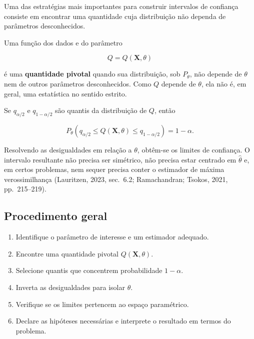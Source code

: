 \documentclass[
  letterpaper,
  DIV=11,
  numbers=noendperiod]{scrreprt}
\providecommand{\tightlist}{%
  \setlength{\itemsep}{0pt}\setlength{\parskip}{0pt}}\usepackage{longtable,booktabs,array}
\begin{document}
Uma das estratégias mais importantes para construir intervalos de
confiança consiste em encontrar uma quantidade cuja distribuição não
dependa de parâmetros desconhecidos.

\begin{tcolorbox}[enhanced jigsaw, colback=white, leftrule=.75mm, colbacktitle=quarto-callout-note-color!10!white, breakable, titlerule=0mm, bottomtitle=1mm, title=\textcolor{quarto-callout-note-color}{\faInfo}\hspace{0.5em}{Definição --- quantidade pivotal}, colframe=quarto-callout-note-color-frame, toprule=.15mm, opacityback=0, bottomrule=.15mm, opacitybacktitle=0.6, arc=.35mm, toptitle=1mm, rightrule=.15mm, coltitle=black, left=2mm]

Uma função dos dados e do parâmetro

\[Q=Q(\mathbf{X},\theta)\]

é uma \textbf{quantidade pivotal} quando sua distribuição, sob
\(P_\theta\), não depende de \(\theta\) nem de outros parâmetros
desconhecidos. Como \(Q\) depende de \(\theta\), ela não é, em geral,
uma estatística no sentido estrito.

\end{tcolorbox}

Se \(q_{\alpha/2}\) e \(q_{1-\alpha/2}\) são quantis da distribuição de
\(Q\), então

\[P_\theta\left(q_{\alpha/2}\leq Q(\mathbf{X},\theta)
\leq q_{1-\alpha/2}\right)=1-\alpha.\]

Resolvendo as desigualdades em relação a \(\theta\), obtêm-se os limites
de confiança. O intervalo resultante não precisa ser simétrico, não
precisa estar centrado em \(\widehat\theta\) e, em certos problemas, nem
sequer precisa conter o estimador de máxima verossimilhança (Lauritzen,
2023, sec.~6.2; Ramachandran; Tsokos, 2021, pp.~215--219).

\subsection{Procedimento geral}\label{procedimento-geral-1}

\begin{enumerate}
\def\labelenumi{\arabic{enumi}.}
\tightlist
\item
  Identifique o parâmetro de interesse e um estimador adequado.
\item
  Encontre uma quantidade pivotal \(Q(\mathbf{X},\theta)\).
\item
  Selecione quantis que concentrem probabilidade \(1-\alpha\).
\item
  Inverta as desigualdades para isolar \(\theta\).
\item
  Verifique se os limites pertencem ao espaço paramétrico.
\item
  Declare as hipóteses necessárias e interprete o resultado em termos do
  problema.
\end{enumerate}
\end{document}
